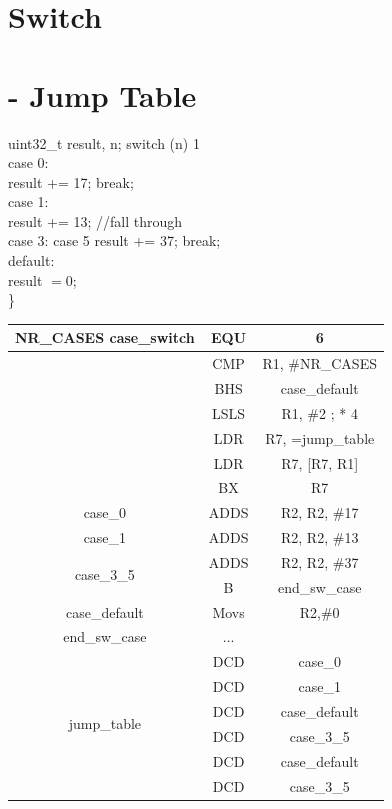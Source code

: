 \documentclass[10pt]{article}
\begin{document}
\section*{Switch}
\section*{- Jump Table}
uint32\_t result, n; switch (n) 1\\
case 0:\\
result += 17; break;\\
case 1:\\
result += 13; //fall through\\
case 3: case 5 result += 37; break;\\
default:\\
result $=0$;\\
\}

\begin{center}
\begin{tabular}{|c|c|c|}
\hline
\multirow[t]{7}{*}{NR\_CASES case\_switch} & EQU & 6 \\
\hline
 & CMP & R1, \#NR\_CASES \\
\hline
 & BHS & case\_default \\
\hline
 & LSLS & R1, \#2 ; * 4 \\
\hline
 & LDR & R7, =jump\_table \\
\hline
 & LDR & R7, [R7, R1] \\
\hline
 & BX & R7 \\
\hline
case\_0 & ADDS & R2, R2, \#17 \\
\hline
case\_1 & ADDS & R2, R2, \#13 \\
\hline
\multirow[t]{2}{*}{case\_3\_5} & ADDS & R2, R2, \#37 \\
\hline
 & B & end\_sw\_case \\
\hline
case\_default & Movs & R2,\#0 \\
\hline
end\_sw\_case & ... &  \\
\hline
\multirow[t]{6}{*}{jump\_table} & DCD & case\_0 \\
\hline
 & DCD & case\_1 \\
\hline
 & DCD & case\_default \\
\hline
 & DCD & case\_3\_5 \\
\hline
 & DCD & case\_default \\
\hline
 & DCD & case\_3\_5 \\
\hline
\end{tabular}
\end{center}
\end{document}
